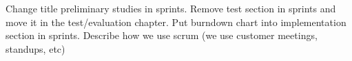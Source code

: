 \nextItem Change title preliminary studies in sprints. 
\nextItem Remove test section in sprints and move it in the test/evaluation chapter.
\nextItem Put burndown chart into implementation section in sprints.
\nextItem  Describe how we use scrum (we use customer meetings, standups, etc)
